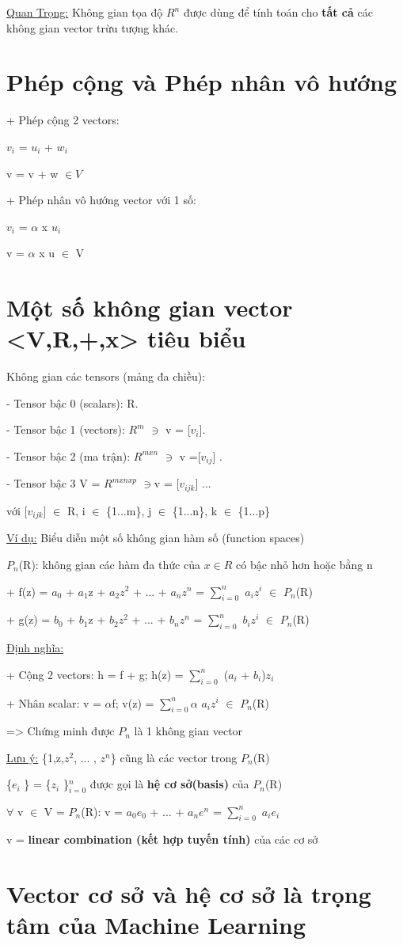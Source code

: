 \documentclass{article}
\begin{document}
\underline{Quan Trọng:} Không gian tọa độ $R^{n}$ được dùng để tính toán cho \textbf{tất cả} các không gian vector trừu tượng khác.

\section{Phép cộng và Phép nhân vô hướng}

+ Phép cộng 2 vectors:  

$v_{i}$ = $u_{i}$ + $w_{i}$

v = v + w $\in V$

+ Phép nhân vô hướng vector với 1 số:

$v_{i}$ = $\alpha $ x $u_{i}$

v = $\alpha$ x u $\in$ V

\section{Một số không gian vector <V,R,+,x> tiêu biểu}

Không gian các tensors (mảng đa chiều): 

- Tensor bậc 0 (scalars): R.

- Tensor bậc 1 (vectors): $R^{m}$  $\ni$ v = [$v_{i}$]. 

 - Tensor bậc 2 (ma trận): $R^{mxn}$  $\ni$ v =[$v_{ij}$] .

- Tensor bậc 3 V = $R^{mxnxp}$  $\ni $v = [$v_{ijk}$] ...

với [$v_{ijk}$] $\in$ R, i $\in$ {\{1...m}\}, j $\in$ {\{1...n}\}, k $\in$ {\{1...p}\}

\underline{Ví dụ:} Biểu diễn một số không gian hàm số (function spaces)

$P_{n}$(R): không gian các hàm đa thức của $x \in R$ có bậc nhỏ hơn hoặc bằng n

+ f(z) = $a_{0}$ + $a_{1}$z + $a_{2}$$z^{2}$ + ... + $a_{n}$$z^{n}$ = 
$\sum_{i=0}^{n}$ 
$a_{i}$$z^{i}$ $\in$ $P_{n}$(R)

+ g(z) =  $b_{0}$ + $b_{1}$z + $b_{2}$$z^{2}$ + ... + $b_{n}$$z^{n}$ = 
$\sum_{i=0}^{n}$ 
$b_{i}$$z^{i}$ $\in$ $P_{n}$(R)

\underline{Định nghĩa:}

+ Cộng 2 vectors: h = f + g; h(z) = 
$\sum_{i=0}^{n}$ ($a_{i}$ + $b_{i}$)$z_{i}$

+ Nhân scalar: v = $\alpha$f; v(z) = 
$\sum_{i=0}^{n}$$\alpha$
$a_{i}$$z^{i}$ $\in$ $P_{n}$(R)

=> Chứng minh được $P_{n}$ là 1 không gian vector

\underline{Lưu ý:} {\{1,z,$z^{2}$, ... , $z^{n}$}\} cũng là các vector trong $P_{n}$(R)

{\{$e_{i}$} \} = {\{$z_{i}$} \}$_{i=0}^{n}$ 
được gọi là \textbf{hệ cơ sở(basis)} của $P_{n}$(R)

$\forall$ v $\in$ V =  $P_{n}$(R): 
v = $a_{0}$$e_{0}$ + ... + $a_{n}$$e^{n}$ = 
$\sum_{i=0}^{n}$ $a_{i}$$e_{i}$

v = \textbf{linear combination (kết hợp tuyến tính)} của các cơ sở

\section{Vector cơ sở và hệ cơ sở là trọng tâm của Machine Learning}
\end{document}
